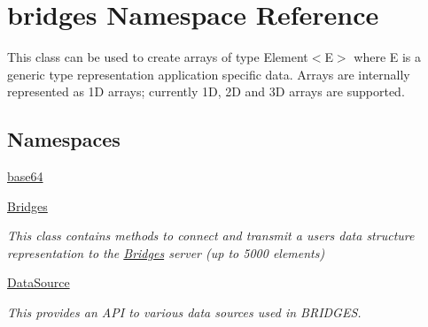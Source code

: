 \hypertarget{namespacebridges}{}\section{bridges Namespace Reference}
\label{namespacebridges}


This class can be used to create arrays of type Element$<$\+E$>$ where E is a generic type representation application specific data. Arrays are internally represented as 1D arrays; currently 1D, 2D and 3D arrays are supported.  


\subsection*{Namespaces}
\begin{DoxyCompactItemize}
\item 
 \mbox{\hyperlink{namespacebridges_1_1base64}{base64}}
\item 
 \mbox{\hyperlink{namespacebridges_1_1_bridges}{Bridges}}
\begin{DoxyCompactList}\small\item\em This class contains methods to connect and transmit a user\textquotesingle{}s data structure representation to the \mbox{\hyperlink{namespacebridges_1_1_bridges}{Bridges}} server (up to 5000 elements) \end{DoxyCompactList}\item 
 \mbox{\hyperlink{namespacebridges_1_1_data_source}{Data\+Source}}
\begin{DoxyCompactList}\small\item\em This provides an A\+PI to various data sources used in B\+R\+I\+D\+G\+ES. \end{DoxyCompactList}\end{DoxyCompactItemize}
